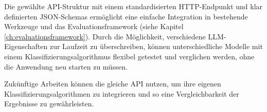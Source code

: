 Die gewählte API-Struktur mit einem standardisierten HTTP-Endpunkt und klar definierten JSON-Schemas ermöglicht eine einfache Integration in bestehende Werkzeuge und das Evaluationsframework (siehe Kapitel \ref{ch:evaluationsframework}). Durch die Möglichkeit, verschiedene \ac{LLM}-Eigenschaften zur Laufzeit zu überschreiben, können unterschiedliche Modelle mit einem Klassifizierungsalgorithmus flexibel getestet und verglichen werden, ohne die Anwendung neu starten zu müssen.

Zukünftige Arbeiten können die gleiche API nutzen, um ihre eigenen Klassifizierungsalgorithmen zu integrieren und so eine Vergleichbarkeit der Ergebnisse zu gewährleisten.